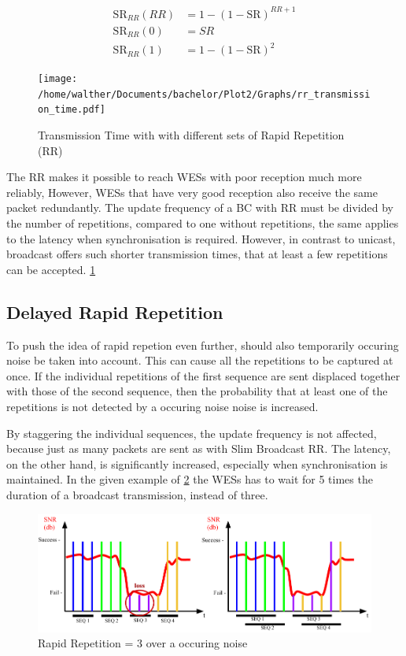 \begin{align}
	\label{math:rr_sr}
	\text{SR}_{RR}(RR)	&= 1-(1-\text{SR})^{RR+1} \\
	\text{SR}_{RR}(0) 	&= SR \\
	\text{SR}_{RR}(1) 	&= 1-(1-\text{SR})^{2}
\end{align}

\begin{figure}[h]
	\centering
	\texttt{[image: /home/walther/Documents/bachelor/Plot2/Graphs/rr\_transmission\_time.pdf]}
	\caption{Transmission Time with with different sets of Rapid Repetition (RR)}
	\label{fig:rr_analytic}
\end{figure}

The RR makes it possible to reach WESs with poor reception much more reliably,
However, WESs that have very good reception also receive the same packet redundantly.
The update frequency of a BC with RR must be divided by the number of repetitions, compared to one without repetitions,
the same applies to the latency when synchronisation is required.
However, in contrast to unicast, broadcast offers such shorter transmission times,
that at least a few repetitions can be accepted. \cref{fig:rr_analytic}

\subsection*{Delayed Rapid Repetition}
\label{sub:DelayedRepetition}

To push the idea of rapid repetion even further, should also temporarily occuring noise be taken into account.
This can cause all the repetitions to be captured at once.
If the individual repetitions of the first sequence are sent displaced together with those of the second sequence,
then the probability that at least one of the repetitions is not detected by a occuring noise noise is increased.

By staggering the individual sequences, the update frequency is not affected,
because just as many packets are sent as with Slim Broadcast RR.
The latency, on the other hand, is significantly increased, especially when synchronisation is maintained.
In the given example of \cref{fig:badChannel} the WESs has to wait for 5 times the duration of a broadcast transmission, instead of three.

\begin{figure}[h]
	\includegraphics[scale=0.75]{figures/BadChannel.pdf}
	\caption{Rapid Repetition = 3 over a occuring noise}
	\label{fig:badChannel}
\end{figure}

